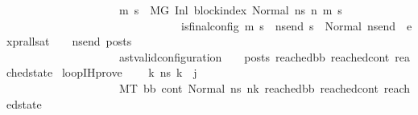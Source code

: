 \begin{isabellebody}
\ \ \ \ \ \ \ \ \ \ \ \ \ \ \ \ \ \ \ \ {\isacharparenleft}{\kern0pt}{\isasymforall}m{\isacharprime}{\kern0pt}\ s{\isacharprime}{\kern0pt}{\isachardot}{\kern0pt}\ \ {\isacharparenleft}{\kern0pt}M{\isacharcomma}{\kern0pt}{\isasymLambda}{\isacharcomma}{\kern0pt}{\isasymGamma}{\isacharcomma}{\kern0pt}{\isasymOmega}{\isacharcomma}{\kern0pt}G\ {\isasymturnstile}{\isacharparenleft}{\kern0pt}Inl\ block{\isacharunderscore}{\kern0pt}index{\isacharcomma}{\kern0pt}\ Normal\ ns{}{\isacharparenright}{\kern0pt}\ {\isacharminus}{\kern0pt}n{\isasymrightarrow}{\isacharasterisk}{\kern0pt}\ {\isacharparenleft}{\kern0pt}m{\isacharprime}{\kern0pt}{\isacharcomma}{\kern0pt}\ s{\isacharprime}{\kern0pt}{\isacharparenright}{\kern0pt}{\isacharparenright}{\kern0pt}\ {\isasymlongrightarrow}\isanewline
\ \ \ \ \ \ \ \ \ \ \ \ \ \ \ \ \ \ \ \ \ \ \ \ \ \ \ \ \ \ \ is{\isacharunderscore}{\kern0pt}final{\isacharunderscore}{\kern0pt}config\ {\isacharparenleft}{\kern0pt}m{\isacharprime}{\kern0pt}{\isacharcomma}{\kern0pt}\ s{\isacharprime}{\kern0pt}{\isacharparenright}{\kern0pt}\ {\isasymlongrightarrow}\ {\isacharparenleft}{\kern0pt}{\isasymforall}ns{\isacharunderscore}{\kern0pt}end{\isachardot}{\kern0pt}\ s{\isacharprime}{\kern0pt}\ {\isacharequal}{\kern0pt}\ Normal\ ns{\isacharunderscore}{\kern0pt}end\ {\isasymlongrightarrow}\ {\isacharparenleft}{\kern0pt}expr{\isacharunderscore}{\kern0pt}all{\isacharunderscore}{\kern0pt}sat\ {\isasymLambda}\ {\isasymGamma}\ {\isasymOmega}\ ns{\isacharunderscore}{\kern0pt}end{\isacharparenright}{\kern0pt}\ posts{\isacharparenright}{\kern0pt}{\isacharparenright}{\kern0pt}\ {\isasymlongrightarrow}\isanewline
\ \ \ \ \ \ \ \ \ \ \ \ \ \ \ \ \ \ \ \ {\isacharparenleft}{\kern0pt}ast{\isacharunderscore}{\kern0pt}valid{\isacharunderscore}{\kern0pt}configuration\ {\isasymLambda}\ {\isasymGamma}\ {\isasymOmega}\ posts\ reached{\isacharunderscore}{\kern0pt}bb\ reached{\isacharunderscore}{\kern0pt}cont\ reached{\isacharunderscore}{\kern0pt}state{\isacharparenright}{\kern0pt}{\isacharparenright}{\kern0pt}{\isachardoublequoteclose}\isanewline
\isanewline
{}\isamarkupfalse%
\ loop{\isacharunderscore}{\kern0pt}IH{\isacharunderscore}{\kern0pt}prove{\isacharcolon}{\kern0pt}\isanewline
\ \ \ {\isachardoublequoteopen}{\isasymAnd}\ k\ ns{}{\isachardot}{\kern0pt}\ k\ {\isacharless}{\kern0pt}\ j\ {\isasymLongrightarrow}\isanewline
\ \ \ \ \ \ \ \ \ \ \ \ \ \ \ \ \ \ \ \ {\isacharparenleft}{\kern0pt}M{\isacharcomma}{\kern0pt}{\isasymLambda}{\isacharcomma}{\kern0pt}{\isasymGamma}{\isacharcomma}{\kern0pt}{\isasymOmega}{\isacharcomma}{\kern0pt}T\ {\isasymturnstile}{\isacharparenleft}{\kern0pt}bb{}{\isacharcomma}{\kern0pt}\ cont{}{\isacharcomma}{\kern0pt}\ Normal\ ns{}{\isacharparenright}{\kern0pt}\ {\isacharminus}{\kern0pt}n{\isasymlongrightarrow}{\isacharcircum}{\kern0pt}k\ {\isacharparenleft}{\kern0pt}reached{\isacharunderscore}{\kern0pt}bb{\isacharcomma}{\kern0pt}\ reached{\isacharunderscore}{\kern0pt}cont{\isacharcomma}{\kern0pt}\ reached{\isacharunderscore}{\kern0pt}state{\isacharparenright}{\kern0pt}{\isacharparenright}{\kern0pt}\ {\isasymLongrightarrow}\isanewline

\end{isabellebody}
